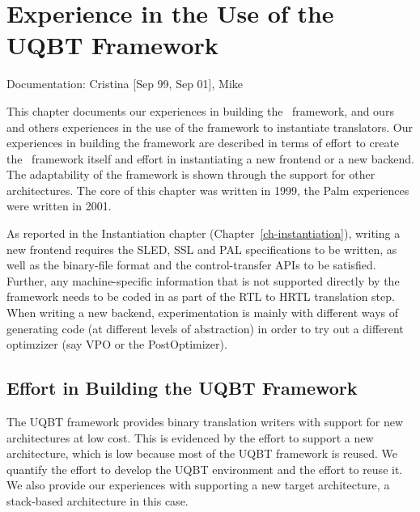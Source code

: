 %
%

\chapter{Experience in the Use of the UQBT Framework}
\label{ch-experience}

{\small
\begin{flushright}
Documentation: Cristina [Sep 99, Sep 01], Mike
\end{flushright}
}

This chapter documents our experiences in building the \uqbt\ 
framework, and ours and others experiences in the use of the 
framework to instantiate translators. 
Our experiences in building the framework are described in terms of 
effort to create the \uqbt\ framework itself and effort in instantiating 
a new frontend or a new backend.  The adaptability of the framework 
is shown through the support for other architectures. 
The core of this chapter was written in 1999, the Palm experiences 
were written in 2001.  

As reported in the Instantiation chapter (Chapter~\ref{ch-instantiation}), 
writing a new frontend requires the SLED, SSL and PAL specifications 
to be written, as well as the binary-file format and the control-transfer
APIs to be satisfied.  Further, any machine-specific information that is 
not supported directly by the framework needs to be coded in as part of
the RTL to HRTL translation step.  
When writing a new backend, experimentation is mainly with different 
ways of generating code (at different levels of abstraction) in order
to try out a different optimzizer (say VPO or the PostOptimizer).  


\section{Effort in Building the UQBT Framework}
The UQBT framework provides binary translation writers with 
support for new architectures at low cost.  
This is evidenced by the effort to support a new architecture,  
which is low because most of the UQBT framework is reused. 
We quantify the effort to develop the UQBT environment and 
the effort to reuse it.  
We also provide our experiences with supporting a new target 
architecture, a stack-based architecture in this case.


